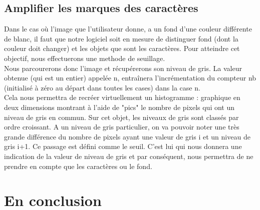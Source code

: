 \documentclass [french,12pt]{article}
\begin{document}
\subsection{Amplifier les marques des caractères}

Dans le cas où l'image que l'utilisateur donne, a un fond d'une couleur différente de blanc, il faut que notre logiciel soit en mesure de distinguer fond (dont la couleur doit changer) et les objets que sont les caractères. 
Pour atteindre cet objectif, nous effectuerons une methode de seuillage. \\
Nous parcourerons donc l'image et récupérerons son niveau de gris. La valeur obtenue (qui est un entier) appelée n, entraînera l'incrémentation du compteur nb (initialisé à zéro au départ dans toutes les cases) dans la case n. \\
Cela nous permettra de recréer virtuellement un histogramme : graphique en deux dimensions montrant à l'aide de "pics" le nombre de pixels qui ont un niveau de gris en commun. Sur cet objet, les niveaux de gris sont classés par ordre croissant.  A un niveau de gris particulier, on va pouvoir noter une très grande différence du nombre de pixels ayant une valeur de gris i et un niveau de gris i+1. Ce passage est défini comme le seuil. C'est lui qui nous donnera une indication de la valeur de niveau de gris et par conséquent, nous permettra de ne prendre en compte que les caractères ou le fond.\\



\section{En conclusion}
\end{document}

